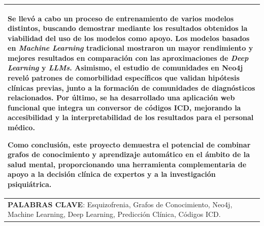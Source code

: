\documentclass[12pt,a4paper,onecolumn,oneside]{report}
\begin{document}
\begin{table}[H]
\begin{tabularx}{\textwidth}{|>{\raggedright\arraybackslash}X|}
    Se llevó a cabo un proceso de entrenamiento de varios modelos distintos, buscando demostrar mediante los resultados obtenidos la viabilidad del uso de los modelos como apoyo. Los modelos basados en \textit{Machine Learning} tradicional mostraron un mayor rendimiento y mejores resultados en comparación con las aproximaciones de \textit{Deep Learning} y \textit{LLMs}. Asimismo, el estudio de comunidades en Neo4j reveló patrones de comorbilidad específicos que validan hipótesis clínicas previas, junto a la formación de comunidades de diagnósticos relacionados. Por último, se ha desarrollado una aplicación web funcional que integra un conversor de códigos ICD, mejorando la accesibilidad y la interpretabilidad de los resultados para el personal médico.

    Como conclusión, este proyecto demuestra el potencial de combinar grafos de conocimiento y aprendizaje automático en el ámbito de la salud mental, proporcionando una herramienta complementaria de apoyo a la decisión clínica de expertos y a la investigación psiquiátrica. \\
    \hline
    \textbf{PALABRAS CLAVE}: Esquizofrenia, Grafos de Conocimiento, Neo4j, Machine Learning, Deep Learning, Predicción Clínica, Códigos ICD. \\
    \hline
\end{tabularx}
\end{table}

\newpage
\end{document}
